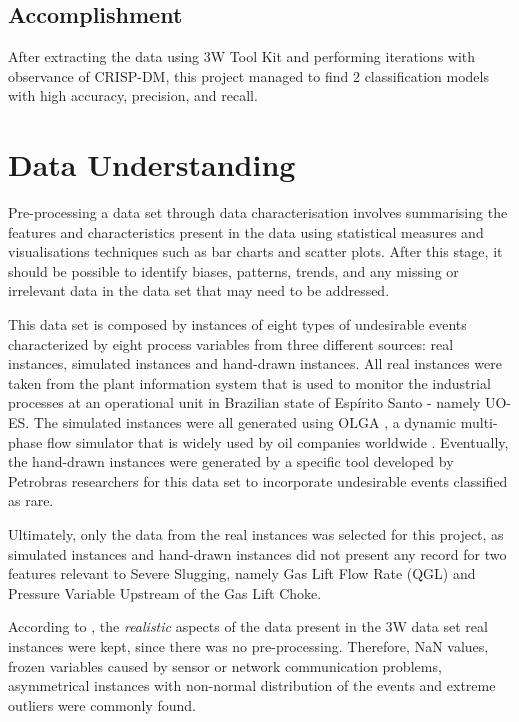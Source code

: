 \documentclass{article}
\begin{document}
\subsection{Accomplishment}
After extracting the data using 3W Tool Kit and performing iterations with observance of CRISP-DM, this project managed to find 2 classification models with high accuracy, precision, and recall.

\section{Data Understanding}

Pre-processing a data set through data characterisation involves summarising the features and characteristics present in the data using statistical measures and visualisations techniques such as bar charts and scatter plots. After this stage, it should be possible to identify biases, patterns, trends, and any missing or irrelevant data in the data set that may need to be addressed.

This data set is composed by instances of eight types of undesirable events characterized by eight process variables from three different sources: real instances, simulated instances and hand-drawn instances. All real instances were taken from the plant information system that is used to monitor the industrial processes at an operational unit in Brazilian state of Espírito Santo - namely UO-ES. The simulated instances were all generated using OLGA \parencite{slb_olga}, a dynamic multi-phase flow simulator that is widely used by oil companies worldwide \parencite{andreolli2016introduccao}. Eventually, the hand-drawn instances were generated by a specific tool developed by Petrobras researchers for this data set to incorporate undesirable events classified as rare.

Ultimately, only the data from the real instances was selected for this project, as simulated instances and hand-drawn instances did not present any record for two features relevant to Severe Slugging, namely Gas Lift Flow Rate (QGL) and Pressure Variable Upstream of the Gas Lift Choke.

According to \textcite{revvargas2019}, the \emph{realistic} aspects of the data present in the 3W data set real instances were kept, since there was no pre-processing. Therefore, NaN values, frozen variables caused by sensor or network communication problems, asymmetrical instances with non-normal distribution of the events and extreme outliers were commonly found. 
\end{document}
